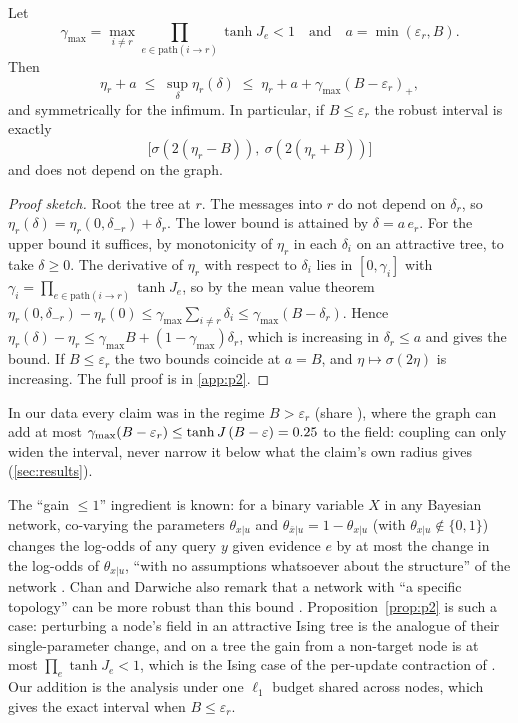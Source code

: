 \begin{proposition}\label{prop:p2}
Let\[\gamma_{\max}=\max_{i\neq r}\prod_{e\in\mathrm{path}(i\to r)}\tanh J_e<1\quad\text{and}\quad a=\min(\varepsilon_r,B).\]Then\[\eta_r+a\;\le\;\sup_\delta\eta_r(\delta)\;\le\;\eta_r+a+\gamma_{\max}(B-\varepsilon_r)_+,\]and symmetrically for the infimum. In particular, if $B\le\varepsilon_r$ the robust interval is exactly\[\big[\sigma(2(\eta_r-B)),\ \sigma(2(\eta_r+B))\big]\]and does not depend on the graph.
\end{proposition}
\begin{proof}[Proof sketch]
Root the tree at $r$. The messages into $r$ do not depend on $\delta_r$, so $\eta_r(\delta)=\eta_r(0,\delta_{-r})+\delta_r$. The lower bound is attained by $\delta=a\,e_r$. For the upper bound it suffices, by monotonicity of $\eta_r$ in each $\delta_i$ on an attractive tree, to take $\delta\ge0$. The derivative of $\eta_r$ with respect to $\delta_i$ lies in $[0,\gamma_i]$ with $\gamma_i=\prod_{e\in\mathrm{path}(i\to r)}\tanh J_e$, so by the mean value theorem $\eta_r(0,\delta_{-r})-\eta_r(0)\le\gamma_{\max}\sum_{i\ne r}\delta_i\le\gamma_{\max}(B-\delta_r)$. Hence $\eta_r(\delta)-\eta_r\le\gamma_{\max}B+(1-\gamma_{\max})\delta_r$, which is increasing in $\delta_r\le a$ and gives the bound. If $B\le\varepsilon_r$ the two bounds coincide at $a=B$, and $\eta\mapsto\sigma(2\eta)$ is increasing. The full proof is in \cref{app:p2}.
\end{proof}
In our data every claim was in the regime $B>\varepsilon_r$ (share \ShareBgtEps{}), where the graph can add at most $\gamma_{\max}(B-\varepsilon_r)\le\tanh J\,(B-\varepsilon)=0.25{}$ to the field: coupling can only widen the interval, never narrow it below what the claim's own radius gives (\cref{sec:results}).

The ``gain $\le 1$'' ingredient is known: for a binary variable $X$ in any Bayesian network, co-varying the parameters $\theta_{x|u}$ and $\theta_{\bar x|u}=1-\theta_{x|u}$ (with $\theta_{x|u}\notin\{0,1\}$) changes the log-odds of any query $y$ given evidence $e$ by at most the change in the log-odds of $\theta_{x|u}$, ``with no assumptions whatsoever about the structure'' of the network \citep[Theorem~3.3, pp.~275--276]{chan2002numbers}. Chan and Darwiche also remark that a network with ``a specific topology'' can be more robust than this bound \citep[p.~281]{chan2002numbers}. Proposition~\ref{prop:p2} is such a case: perturbing a node's field in an attractive Ising tree is the analogue of their single-parameter change, and on a tree the gain from a non-target node is at most $\prod_e\tanh J_e<1$, which is the Ising case of the per-update contraction of \citet[Theorem~8]{ihler2005loopy}. Our addition is the analysis under one $\ell_1$ budget shared across nodes, which gives the exact interval when $B\le\varepsilon_r$.

